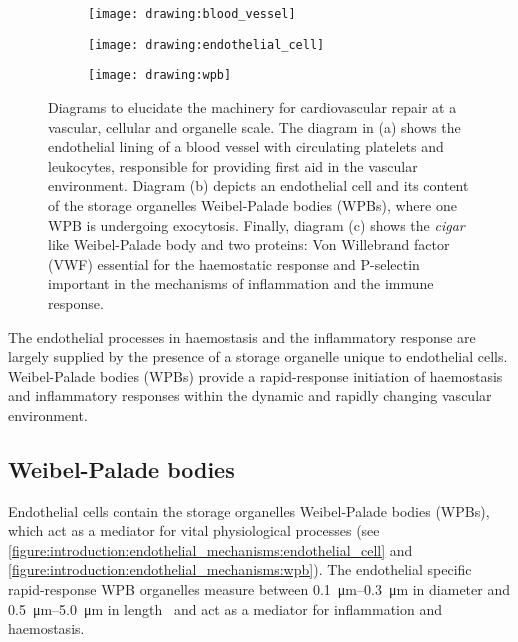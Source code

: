 \begin{figure}[htbp]\centering
\begin{minipage}{0.49\textwidth}
	\begin{subfigure}[b]{\linewidth}
		\centering
		\texttt{[image: drawing:blood\_vessel]}
		\caption{}
		\label{figure:introduction:endothelial_mechanisms:blood_vessel}
		\vspace{1ex}
	\end{subfigure}
\end{minipage}
\begin{minipage}{0.49\textwidth}
	\begin{subfigure}[b]{\linewidth}
		\centering
		\texttt{[image: drawing:endothelial\_cell]}
		\caption{}
		\label{figure:introduction:endothelial_mechanisms:endothelial_cell}
		\vspace{10.5ex}
	\end{subfigure}
	\begin{subfigure}[b]{\linewidth}
		\centering
		\texttt{[image: drawing:wpb]}
		\caption{}
		\label{figure:introduction:endothelial_mechanisms:wpb}
		\vspace{1ex}
	\end{subfigure}
\end{minipage}
\caption[Endothelial mechanisms for cardiovascular repair]{Diagrams to elucidate the machinery for cardiovascular repair at a vascular, cellular and organelle scale. The diagram in (a) shows the endothelial lining of a blood vessel with circulating platelets and leukocytes, responsible for providing first aid in the vascular environment. Diagram (b) depicts an endothelial cell and its content of the storage organelles Weibel-Palade bodies (WPBs), where one WPB is undergoing exocytosis. Finally, diagram (c) shows the \emph{cigar} like Weibel-Palade body and two proteins: Von Willebrand factor (VWF) essential for the haemostatic response and P-selectin important in the mechanisms of inflammation and the immune response.}
\label{figure:endothelial_mechanisms}
\end{figure}

The endothelial processes in haemostasis and the inflammatory response are largely supplied by the presence of a storage organelle unique to endothelial cells. Weibel-Palade bodies (WPBs) provide a rapid-response initiation of haemostasis and inflammatory responses within the dynamic and rapidly changing vascular environment.

\subsection{Weibel-Palade bodies}
\label{introduction:endothelial_cellular_biology:wpb}
Endothelial cells contain the storage organelles Weibel-Palade bodies (WPBs), which act as a mediator for vital physiological processes (see \autoref{figure:introduction:endothelial_mechanisms:endothelial_cell} and \autoref{figure:introduction:endothelial_mechanisms:wpb}). The endothelial specific rapid-response WPB organelles measure between \SIrange{0.1}{0.3}{\micro\meter} in diameter and \SIrange{0.5}{5.0}{\micro\meter} in length~\cite{Ferraro2014} and act as a mediator for inflammation and haemostasis.

